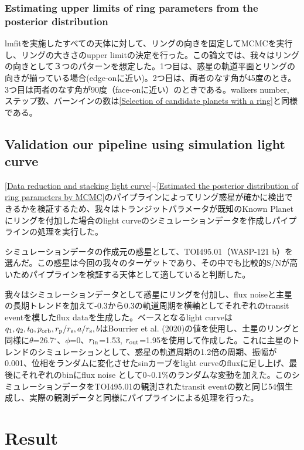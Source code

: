 \documentclass[fleqn,usenatbib, onecolumn,dvipdfmx]{mnras}
\begin{document}
\subsubsection{Estimating upper limits of ring parameters from the posterior distribution}
lmfitを実施したすべての天体に対して、リングの向きを固定してMCMCを実行し、リングの大きさのupper limitの決定を行った。この論文では、我々はリングの向きとして３つのパターンを想定した。1つ目は、惑星の軌道平面とリングの向きが揃っている場合(edge-onに近い)。2つ目は、両者のなす角が45度のとき。3つ目は両者のなす角が90度（face-onに近い）のときである。walkers number, ステップ数、バーンインの数は\ref{Selection of candidate planets with a ring}と同様である。



\subsection{Validation our pipeline using simulation light curve}
\ref{Data reduction and stacking light curve}\textasciitilde \ref{Estimated the posterior distribution of ring parameters by MCMC}のパイプラインによってリング惑星が確かに検出できるかを検証するため、我々はトランジットパラメータが既知のKnown Planetにリングを付加した場合のlight curveのシミュレーションデータを作成しパイプラインの処理を実行した。

シミュレーションデータの作成元の惑星として、TOI495.01（WASP-121 b）を選んだ。この惑星は今回の我々のターゲットであり、その中でも比較的S/Nが高いためパイプラインを検証する天体として適していると判断した。

我々はシミュレーションデータとして惑星にリングを付加し、flux noiseと主星の長期トレンドを加えて-0.3から0.3の軌道周期を横軸としてそれぞれのtransit eventを模したflux dataを生成した。ベースとなるlight curveは$q_1, q_2, t_0, p_{\rm{orb}}, r_{\rm{p}}/r_{\rm{s}}, a/r_{\rm{s}}, b$はBourrier et al. (2020)の値を使用し、土星のリングと同様に$\theta$=26.7$^\circ$、$\phi$=0、$r_{\rm{in}}$=1.53, $r_{\rm{out}}$=1.95を使用して作成した。これに主星のトレンドのシミュレーションとして、惑星の軌道周期の1.2倍の周期、振幅が0.001、位相をランダムに変化させたsinカーブをlight curveのfluxに足し上げ、最後にそれぞれのbinにflux noise として0\textasciitilde0.1$\%$のランダムな変動を加えた。このシミュレーションデータをTOI495.01の観測されたtransit eventの数と同じ54個生成し、実際の観測データと同様にパイプラインによる処理を行った。


\section{Result}
\end{document}
